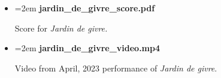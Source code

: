 \documentclass[12pt,twoside,maitrise]{dms_ks}
\theoremstyle{definition}
\begin{document}
{{\begin{itemize}
    \item \hangindent=2em \textbf{jardin\_de\_givre\_score.pdf}
    \par Score for \textit{Jardin de givre.}
    
    \item \hangindent=2em \textbf{jardin\_de\_givre\_video.mp4}
    \par Video from April, 2023 performance of \textit{Jardin de givre}.
\end{itemize}



}}
\end{document}
